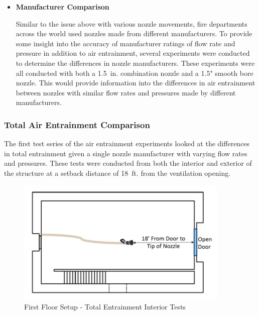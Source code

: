 \documentclass{article}
\begin{document}
\begin{itemize}
\vspace*{\baselineskip}

\item \bf{Manufacturer Comparison}
\normalfont
\vspace*{\baselineskip}

Similar to the issue above with various nozzle movements, fire departments across the world used nozzles made from different manufacturers. To provide some insight into the accuracy of manufacturer ratings of flow rate and pressure in addition to air entrainment, several experiments were conducted to determine the differences in nozzle manufacturers. These experiments were all conducted with both a 1.5~in. combination nozzle and a 1.5" smooth bore nozzle. This would provide information into the differences in air entrainment between nozzles with similar flow rates and pressures made by different manufacturers.

\vspace*{\baselineskip}

\end{itemize}

\clearpage

\subsubsection{Total Air Entrainment Comparison}

The first test series of the air entrainment experiments looked at the differences in total entrainment given a single nozzle manufacturer with varying flow rates and pressures. These tests were conducted from both the interior and exterior of the structure at a setback distance of 18~ft. from the ventilation opening. 

\begin{figure}[!ht]
	\centering
	\includegraphics[width=4in]{Figures/Air_Entrainment/Measurement_Locations_Firstfloor.png}
	\caption{First Floor Setup - Total Entrainment Interior Tests}
	\label{fig:First_Floor_Setup_Total_Entrainment_Interior_Tests}
\end{figure}
\end{document}
